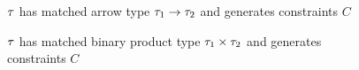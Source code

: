 \documentclass[formalism.tex]{subfiles}
\begin{document}
\begin{mathpar}

\end{mathpar}

\begin{figure}[htb]
  \raggedright
   $\TMV$ has matched arrow type $\TArrow{\TMV_1}{\TMV_2}$ and generates constraints $C$
  \begin{mathpar}

  \end{mathpar}

   $\TMV$ has matched binary product type $\TProd{\TMV_1}{\TMV_2}$ and generates constraints $C$
  \begin{mathpar}

  \end{mathpar}
  \label{fig:Matched Rules}
\end{figure}
\end{document}
